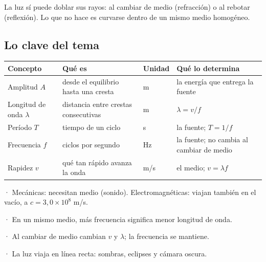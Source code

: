 \begin{clave}[{Recuerda}] La luz sí puede doblar sus rayos: al cambiar de medio (refracción) o al rebotar (reflexión). Lo que no hace es curvarse dentro de un mismo medio homogéneo.\end{clave}
\subsection{Lo clave del tema}
\begin{center}\small
\begin{tabularx}{\linewidth}{@{}>{\raggedright\arraybackslash\hsize=0.79\hsize}X>{\raggedright\arraybackslash\hsize=1.36\hsize}X>{\raggedright\arraybackslash\hsize=0.34\hsize}X>{\raggedright\arraybackslash\hsize=1.51\hsize}X@{}}
\toprule
\textbf{Concepto} & \textbf{Qué es} & \textbf{Unidad} & \textbf{Qué lo determina} \\
\midrule
Amplitud $A$ & desde el equilibrio hasta una cresta & m & la energía que entrega la fuente \\
Longitud de onda $\lambda$ & distancia entre crestas consecutivas & m & $\lambda = v/f$ \\
Período $T$ & tiempo de un ciclo & s & la fuente; $T = 1/f$ \\
Frecuencia $f$ & ciclos por segundo & Hz & la fuente; no cambia al cambiar de medio \\
Rapidez $v$ & qué tan rápido avanza la onda & m/s & el medio; $v = \lambda f$ \\
\bottomrule
\end{tabularx}
\end{center}
 
\begin{clave}[{Recuerda}] · Mecánicas: necesitan medio (sonido). Electromagnéticas: viajan también en el vacío, a $c = 3{,}0\times10^{8}$ m/s.\par · En un mismo medio, más frecuencia significa menor longitud de onda.\par · Al cambiar de medio cambian $v$ y $\lambda$; la frecuencia se mantiene.\par · La luz viaja en línea recta: sombras, eclipses y cámara oscura.\end{clave}
 
